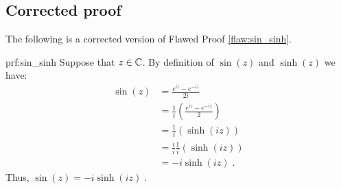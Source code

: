 \clearpage
\subsection{Corrected proof}

The following is a corrected version of Flawed Proof \ref{flaw:sin_sinh}. %

\begin{prf}{prf:sin_sinh} %
Suppose that $z \in \mathbb C$.
By definition of $\sin(z)$ and $\sinh(z)$ we have:
\begin{align*}
    \sin(z) &= \frac{e^{iz}-e^{-iz}}{2i} \\
    &= \frac{1}{i} \left( \frac{e^{iz}-e^{-iz}}{2} \right)\\
    &=  \frac{1}{i}\left( \sinh(iz) \right) \\
     &=  \frac{i}{i}\frac{1}{i}\left( \sinh(iz) \right) \\
    &= -i\sinh(iz)\;.
\end{align*}
Thus, $\sin(z) = -i\sinh(iz)\;.$
\end{prf} 